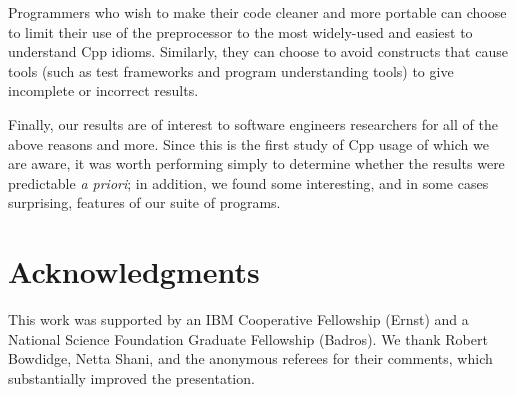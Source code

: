 \documentclass[10pt]{article}
\begin{document}
Programmers who wish to make their code cleaner and more portable can
choose to limit their use of the preprocessor to the most widely-used
and easiest to understand Cpp idioms.  Similarly, they can choose to
avoid constructs that cause tools (such as test frameworks and program
understanding tools) to give incomplete or incorrect results.


Finally, our results are of interest to software engineers researchers
for all of the above reasons and more.  Since this is the first study
of Cpp usage of which we are aware, it was worth performing simply to
determine whether the results were predictable \emph{a priori}; in
addition, we found some interesting, and in some cases surprising,
features of our suite of programs.


\section*{Acknowledgments}

This work was supported by an IBM Cooperative Fellowship (Ernst) and a
National Science Foundation Graduate Fellowship (Badros).  We thank
Robert Bowdidge, Netta Shani, and the anonymous referees for their
comments, which substantially improved the presentation.
    


{\small }
\end{document}
